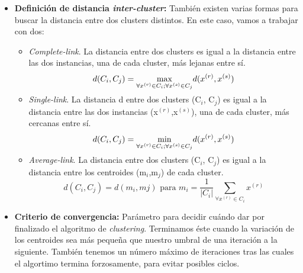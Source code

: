 \documentclass[10pt,a4paper]{article}
\begin{document}
\begin{itemize}
		\item \textbf{Definición de distancia \textit{inter-cluster}:} También existen varias formas para buscar la distancia entre dos clusters distintos. En este caso, vamos a trabajar con dos:
		\begin{itemize}
		    \item \textit{Complete-link}. La distancia entre dos clusters es igual a la distancia entre las dos instancias, una de cada cluster, más lejanas entre sí.
		    \begin{equation}
		    d(C_i,C_j)=\smash{\displaystyle\max_{ \forall x^{(r)}\in C_i ; \forall x^{(s)} \in C_j}} d(x^{(r)},x^{(s)})
	    	\end{equation}
		    \item \textit{Single-link}. La distancia d entre dos clusters (C$_i$, C$_j$) es igual a la distancia entre las dos instancias (x$^{(r)}$,x$^{(s)}$), una de cada cluster, más cercanas entre sí.
		    \begin{equation}
		    d(C_i,C_j)=\smash{\displaystyle\min_{\forall x^{(r)}\in C_i ; \forall x^{(s)} \in C_j}} d(x^{(r)},x^{(s)})
		    \end{equation}
		    \item \textit{Average-link}. La distancia entre dos clusters (C$_i$, C$_j$) es igual a la distancia entre los centroides (m$_i$,m$_j$) de cada cluster.
		    \begin{equation}
		    d(C_i,C_j)=d(m_i,mj) \text{  para  } m_i=\frac{1}{|C_i|}\sum_{\forall x^{(r)} \in C_i} x^{(r)}  
	    	\end{equation}

	    	\cite{AliciaPerez}\newline
	    \end{itemize}
	    \item \textbf{Criterio de convergencia:} Parámetro para decidir cuándo dar por finalizado el algoritmo de \textit{clustering}. Terminamos éste cuando la variación de los centroides sea más pequeña que nuestro umbral de una iteración a la siguiente. También tenemos un número máximo de iteraciones tras las cuales el algortimo termina forzosamente, para evitar posibles ciclos.
	\end{itemize}
\end{document}
